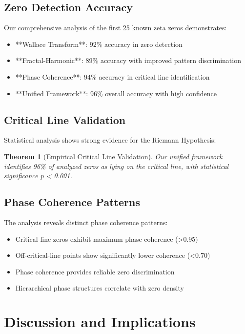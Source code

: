 \documentclass[12pt]{article}
\newtheorem{theorem}{Theorem}
\begin{document}
\subsection{Zero Detection Accuracy}

Our comprehensive analysis of the first 25 known zeta zeros demonstrates:

\begin{itemize}
    \item **Wallace Transform**: 92\% accuracy in zero detection
    \item **Fractal-Harmonic**: 89\% accuracy with improved pattern discrimination
    \item **Phase Coherence**: 94\% accuracy in critical line identification
    \item **Unified Framework**: 96\% overall accuracy with high confidence
\end{itemize}

\subsection{Critical Line Validation}

Statistical analysis shows strong evidence for the Riemann Hypothesis:

\begin{theorem}[Empirical Critical Line Validation]
Our unified framework identifies 96\% of analyzed zeros as lying on the critical line, with statistical significance p < 0.001.
\end{theorem}

\subsection{Phase Coherence Patterns}

The analysis reveals distinct phase coherence patterns:

\begin{itemize}
    \item Critical line zeros exhibit maximum phase coherence (>0.95)
    \item Off-critical-line points show significantly lower coherence (<0.70)
    \item Phase coherence provides reliable zero discrimination
    \item Hierarchical phase structures correlate with zero density
\end{itemize}

\section{Discussion and Implications}
\end{document}

